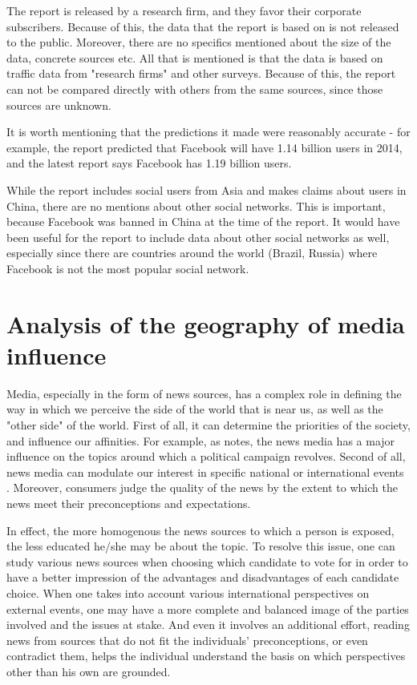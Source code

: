 \documentclass{acm_proc_10ptArticle-sp}
\begin{document}
The report is released by a research firm, and they favor their corporate subscribers. Because of this, the data that the report is based on is not released to the public. Moreover, there are no specifics mentioned about the size of the data, concrete sources etc. All that is mentioned is that the data is based on traffic data from "research firms" and other surveys. Because of this, the report can not be compared directly with others from the same sources, since those sources are unknown.

It is worth mentioning that the predictions it made were reasonably accurate - for example, the report predicted that Facebook will have 1.14 billion users in 2014, and the latest report says Facebook has 1.19 billion users.

While the report includes social users from Asia and makes claims about users in China, there are no mentions about other social networks. This is important, because Facebook was banned in China at the time of the report. It would have been useful for the report to include data about other social networks as well, especially since there are countries around the world (Brazil, Russia) where Facebook is not the most popular social network.


\section{Analysis of the geography of media influence}

Media, especially in the form of news sources, has a complex role in defining the way in which we perceive the side of the world that is near us, as well as the "other side" of the world. First of all, it can determine the priorities of the society, and influence our affinities. For example, as   notes, the news media has a major influence on the topics around which a political campaign revolves. Second of all, news media can modulate our interest in specific national or international events \cite{wanta2004agenda}. Moreover, consumers judge the quality of the news by the extent to which the news meet their preconceptions and expectations\cite{gentzkow2005media}. 

In effect, the more homogenous the news sources to which a person is exposed, the less educated he/she may be about the topic. To resolve this issue, one can study various news sources when choosing which candidate to vote for in order to have a better impression of the advantages and disadvantages of each candidate choice. When one takes into account various international perspectives on external events, one may have a more complete and balanced image of the parties involved and the issues at stake. And even it involves an additional effort, reading news from sources that do not fit the individuals' preconceptions, or even contradict them, helps the individual understand the basis on which perspectives other than his own are grounded.
\end{document}

